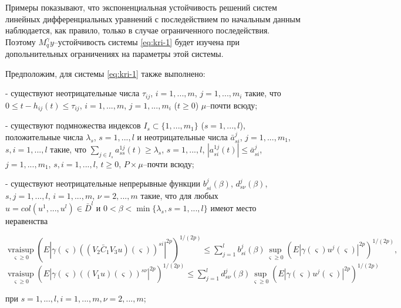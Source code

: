 Примеры показывают, что экспоненциальная устойчивость решений систем
линейных дифференциальных уравнений с последействием по начальным
данным наблюдается, как правило, только в случае ограниченного
последействия. Поэтому $M_q^\gamma y$--устойчивость системы \eqref{eq:kri-1}
будет изучена при допольнительных ограничениях  на параметры этой
системы.

Предположим, для системы \eqref{eq:kri-1} также выполнено:

- существуют неотрицательные числа $\tau_{ij}$, $i = 1,...,m$, $j =
1,...,m_i$ такие, что $0 \leq
 t- h_{ij}(t) \leq \tau _{ij}$, $i = 1,...,m$, $j = 1,...,m_i$ ($t
 \geq 0$) $\mu $--почти всюду;

 - существуют подмножества индексов $I_s \subset \{1,..., m_1\}$ ($s
= 1,..., l$), положительные числа  $ \lambda _s$, $s = 1, ..., l$ и
неотрицательные числа $\bar a_{si}^j$, $j = 1, ..., m_1$, $s,i = 1,
 ..., l$ такие, что $\sum \limits_{j\in I_s}a^{1j}_{ss}(t) \geq
 \lambda _s$, $s = 1,...,l$, $|a^{1j}_{si}(t)|\leq \bar a^j_{si}$, $j =
 1,...,m_1$, $s,i = 1, ..., l$, $t \geq 0$, $P\times\mu$--почти
всюду;

- существуют неотрицательные непрерывные функции $b_{si}^j(\beta)$,
$d_{s\nu}^j(\beta)$, $s, j = 1, ..., l$, $i = 1, ..., m$, $\nu = 2,
..., m$ такие, что для любых $u = col (u^1, ..., u^l) \in \bar D^l$
и $0<\beta < \min \{\lambda _s, s = 1, ..., l \}$ имеют  место
неравенства
 \begin{center}
 $ \mathrel {\mathop
 {vrai \sup} \limits _{\varsigma \geq 0}} \left(E\left |\gamma
(\varsigma)((V_2\bar C_1V_3 u)(\varsigma ))^{si}\right |^{2p}\right
)^{1/(2p)} \leq \sum \limits_{j=1}^lb_{si}^j(\beta)\sup \limits
_{\varsigma \geq 0}\left (E\left |\gamma
(\varsigma)u^j(\varsigma)\right |^{2p}\right )^{1/(2p)},$\\
$\mathrel {\mathop
 {vrai \sup}\limits _{\varsigma \geq 0}} \left(E\left |\gamma
(\varsigma)((V_1 u)(\varsigma ))^{s\nu}\right |^{2p}\right
)^{1/(2p)} \leq \sum \limits_{j=1}^ld_{s\nu}^j(\beta)\sup \limits
_{\varsigma \geq 0}\left (E\left |\gamma
(\varsigma)u^j(\varsigma)\right |^{2p}\right )^{1/(2p)}$
\end{center} при $s = 1,...,l, i = 1, ..., m , \nu = 2, ..., m$;

